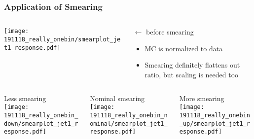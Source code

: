 \documentclass{beamer}
\begin{document}
\begin{frame}

  \frametitle{Application of Smearing}

  \centering

  \begin{columns}
    \begin{column}{0.33\linewidth}
      \texttt{[image: 191118\_really\_onebin/smearplot\_jet1\_response.pdf]}
    \end{column}
    \begin{column}{0.67\linewidth}
      $\leftarrow$ before smearing \\

      \begin{itemize}
      \item MC is normalized to data
      \item Smearing definitely flattens out ratio, but scaling is needed too
      \end{itemize}

    \end{column}
  \end{columns}

  \begin{columns}
    \begin{column}{0.33\linewidth}
      \centering
      Less smearing \\
      \texttt{[image: 191118\_really\_onebin\_down/smearplot\_jet1\_response.pdf]}
    \end{column}
    \begin{column}{0.33\linewidth}
      \centering
      Nominal smearing \\
      \texttt{[image: 191118\_really\_onebin\_nominal/smearplot\_jet1\_response.pdf]}
    \end{column}
    \begin{column}{0.33\linewidth}
      \centering
      More smearing \\
      \texttt{[image: 191118\_really\_onebin\_up/smearplot\_jet1\_response.pdf]}
    \end{column}
  \end{columns}

\end{frame}
\end{document}
